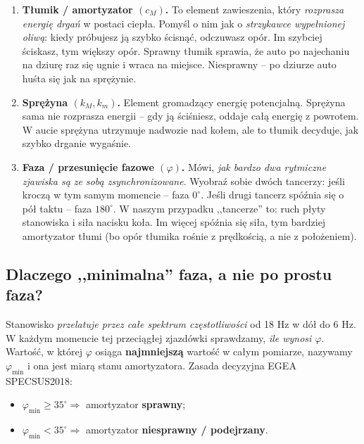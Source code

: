 \documentclass[11pt,a4paper]{article}
\theoremstyle{plainpol}
\begin{document}
\begin{enumerate}
  \item \textbf{Tłumik / amortyzator $(c_M)$.} To element zawieszenia, który
    \emph{rozprasza energię drgań} w postaci ciepła. Pomyśl o nim jak
    o \emph{strzykawce wypełnionej oliwą}: kiedy próbujesz ją szybko ścisnąć,
    odczuwasz opór. Im szybciej ściskasz, tym większy opór. Sprawny tłumik
    sprawia, że auto po najechaniu na dziurę raz się ugnie i wraca na
    miejsce. Niesprawny -- po dziurze auto huśta się jak na sprężynie.

  \item \textbf{Sprężyna $(k_M, k_m)$.} Element gromadzący energię potencjalną.
    Sprężyna sama nie rozprasza energii -- gdy ją ściśniesz, oddaje
    całą energię z powrotem. W aucie sprężyna utrzymuje nadwozie nad
    kołem, ale to tłumik decyduje, jak szybko drganie wygaśnie.

  \item \textbf{Faza / przesunięcie fazowe $(\varphi)$.} Mówi, \emph{jak
    bardzo dwa rytmiczne zjawiska są ze sobą zsynchronizowane}. Wyobraź
    sobie dwóch tancerzy: jeśli kroczą w tym samym momencie -- faza
    $0^\circ$. Jeśli drugi tancerz spóźnia się o pół taktu -- faza
    $180^\circ$. W naszym przypadku ,,tancerze'' to: ruch płyty
    stanowiska i siła nacisku koła. Im więcej spóźnia się siła, tym
    bardziej amortyzator tłumi (bo opór tłumika rośnie z prędkością, a nie
    z położeniem).
\end{enumerate}

\subsection{Dlaczego ,,minimalna'' faza, a nie po prostu faza?}

Stanowisko \emph{przelatuje przez całe spektrum częstotliwości} od 18 Hz
w dół do 6 Hz. W każdym momencie tej przeciągłej zjazdówki sprawdzamy,
\emph{ile wynosi $\varphi$}. Wartość, w której $\varphi$ osiąga
\textbf{najmniejszą} wartość w całym pomiarze, nazywamy
$\varphi_{\min}$ i ona jest miarą stanu amortyzatora. Zasada decyzyjna
EGEA SPECSUS2018:
\begin{itemize}
  \item $\varphi_{\min} \geq 35^\circ \Rightarrow$ amortyzator
    \textbf{sprawny};
  \item $\varphi_{\min} < 35^\circ \Rightarrow$ amortyzator
    \textbf{niesprawny / podejrzany}.
\end{itemize}
\end{document}
